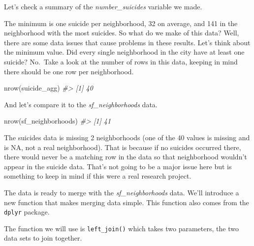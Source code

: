 \documentclass[
]{krantz}
\makeatletter
\newenvironment{Shaded}{\begin{snugshade}}{\end{snugshade}}
\newcommand{\CommentTok}[1]{\textcolor[rgb]{0.37,0.37,0.37}{\textit{#1}}}
\newcommand{\FunctionTok}[1]{\textcolor[rgb]{0,0,0}{#1}}
\newcommand{\NormalTok}[1]{#1}
\newcommand{\SpecialCharTok}[1]{\textcolor[rgb]{0,0,0}{#1}}
\newenvironment{kframe}{%
\medskip{}
\setlength{\fboxsep}{.8em}
 \def\at@end@of@kframe{}%
 \ifinner\ifhmode%
  \def\at@end@of@kframe{\end{minipage}}%
  \begin{minipage}{\columnwidth}%
 \fi\fi%
 \def\FrameCommand##1{\hskip\@totalleftmargin \hskip-\fboxsep
 \colorbox{shadecolor}{##1}\hskip-\fboxsep
     \hskip-\linewidth \hskip-\@totalleftmargin \hskip\columnwidth}%
 \MakeFramed {\advance\hsize-\width
   \@totalleftmargin\z@ \linewidth\hsize
   \@setminipage}}%
 {\par\unskip\endMakeFramed%
 \at@end@of@kframe}
\renewenvironment{Shaded}{\begin{kframe}}{\end{kframe}}
\makeatother
\begin{document}
Let's check a summary of the \emph{number\_suicides}
variable we made.

\begin{Shaded}
\end{Shaded}

The minimum is one suicide per neighborhood, 32 on average,
and 141 in the neighborhood with the most suicides. So what
do we make of this data? Well, there are some data issues
that cause problems in these results. Let's think about the
minimum value. Did every single neighborhood in the city
have at least one suicide? No.~Take a look at the number of
rows in this data, keeping in mind there should be one row
per neighborhood.

\begin{Shaded}
\begin{Highlighting}[]
\FunctionTok{nrow}\NormalTok{(suicide\_agg)}
\CommentTok{\#\textgreater{} [1] 40}
\end{Highlighting}
\end{Shaded}

And let's compare it to the \emph{sf\_neighborhoods} data.

\begin{Shaded}
\begin{Highlighting}[]
\FunctionTok{nrow}\NormalTok{(sf\_neighborhoods)}
\CommentTok{\#\textgreater{} [1] 41}
\end{Highlighting}
\end{Shaded}

The suicides data is missing 2 neighborhoods (one of the 40
values is missing and is NA, not a real neighborhood). That
is because if no suicides occurred there, there would never
be a matching row in the data so that neighborhood wouldn't
appear in the suicide data. That's not going to be a major
issue here but is something to keep in mind if this were a
real research project.

The data is ready to merge with the \emph{sf\_neighborhoods}
data. We'll introduce a new function that makes merging data
simple. This function also comes from the \texttt{dplyr}
package.

The function we will use is \texttt{left\_join()} which
takes two parameters, the two data sets to join together.
\end{document}
